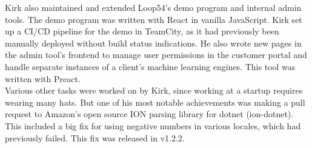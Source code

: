 \documentclass[10pt,letterpaper]{article}
\begin{document}
{	Kirk also maintained and extended Loop54's demo program and internal admin tools. The demo program was written with React in vanilla JavaScript. Kirk set up a CI/CD pipeline for the demo in TeamCity, as it had previously been manually deployed without build status indications. He also wrote new pages in the admin tool's frontend to manage user permissions in the customer portal and handle separate instances of a client’s machine learning engines. This tool was written with Preact. \\

	Various other tasks were worked on by Kirk, since working at a startup requires wearing many hats. But one of his most notable achievements was making a pull request to Amazon's open source ION parsing library for dotnet (ion-dotnet). This included a big fix for using negative numbers in various locales, which had previously failed. This fix was released in v1.2.2. \\
}
\end{document}
